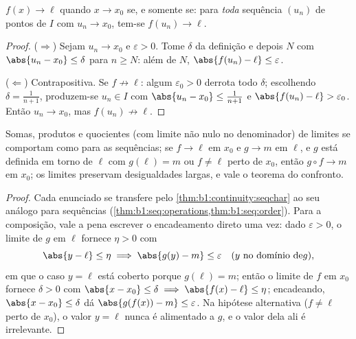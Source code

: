 \begin{theorem}\label{thm:b1:continuity:seqchar}
$f(x) \to \ell$ quando $x \to x_0$ se, e somente se: para \emph{toda}
sequência $(u_n)$ de pontos de $I$ com $u_n \to x_0$, tem-se
$f(u_n) \to \ell$.
\end{theorem}

\begin{proof}
($\Rightarrow$) Sejam $u_n \to x_0$ e $\varepsilon > 0$. Tome
$\delta$ da definição e depois $N$ com $\abs{u_n - x_0} \leq
\delta$ para $n \geq N$: além de $N$, $\abs{f(u_n) - \ell} \leq
\varepsilon$.

($\Leftarrow$) Contrapositiva. Se $f \not\to \ell$: algum
$\varepsilon_0 > 0$ derrota todo $\delta$; escolhendo $\delta =
\frac{1}{n+1}$, produzem-se $u_n \in I$ com $\abs{u_n - x_0} \leq
\frac{1}{n+1}$ e $\abs{f(u_n) - \ell} > \varepsilon_0$. Então $u_n
\to x_0$, mas $f(u_n) \not\to \ell$.
\end{proof}

\begin{corollary}\label{cor:b1:continuity:operations}
Somas, produtos e quocientes (com limite não nulo no denominador) de
limites se comportam como para as sequências; se $f \to \ell$ em $x_0$ e
$g \to m$ em $\ell$, e $g$ está definida em torno de $\ell$ com
$g(\ell) = m$ ou $f \neq \ell$ perto de $x_0$, então $g \circ f \to m$ em $x_0$;
os limites preservam desigualdades largas, e vale o teorema do
confronto.
\end{corollary}

\begin{proof}
Cada enunciado se transfere pelo
\cref{thm:b1:continuity:seqchar} ao seu análogo para sequências
(\cref{thm:b1:seq:operations,thm:b1:seq:order}). Para a composição,
vale a pena escrever o encadeamento direto uma vez: dado $\varepsilon >
0$, o limite de $g$ em $\ell$ fornece $\eta > 0$ com
\[
\abs{y - \ell} \leq \eta \implies \abs{g(y) - m} \leq
\varepsilon \quad (y \text{ no domínio de} g),
\]
em que o caso $y = \ell$ está coberto porque $g(\ell) = m$; então
o limite de $f$ em $x_0$ fornece $\delta > 0$ com $\abs{x -
x_0} \leq \delta \implies \abs{f(x) - \ell} \leq \eta$; encadeando,
$\abs{x - x_0} \leq \delta$ dá $\abs{g(f(x)) - m} \leq
\varepsilon$. Na hipótese alternativa ($f \neq \ell$ perto de
$x_0$), o valor $y = \ell$ nunca é alimentado a $g$, e o valor dela
ali é irrelevante.
\end{proof}


